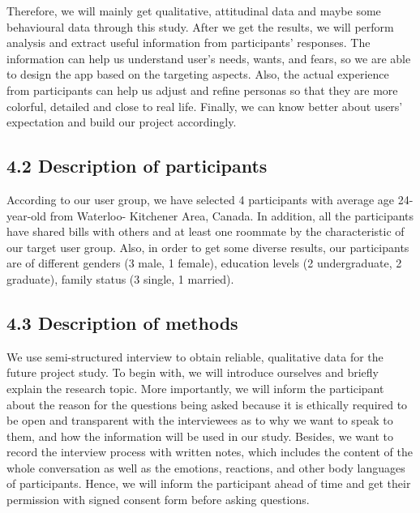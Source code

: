 \documentclass{sigchi}
\begin{document}
Therefore, we will mainly get qualitative, attitudinal data and maybe some behavioural data through this study. After we get the results, we will perform analysis and extract useful information from participants' responses. The information can help us understand user's needs, wants, and fears, so we are able to design the app based on the targeting aspects. Also, the actual experience from participants can help us adjust and refine personas so that they are more colorful, detailed and close to real life. Finally, we can know better about users' expectation and build our project accordingly.



\subsection{4.2 Description of participants}

According to our user group, we have selected 4 participants with average age 24-year-old from Waterloo- Kitchener Area, Canada. In addition, all the participants have shared bills with others and at least one roommate by the characteristic of our target user group. Also, in order to get some diverse results, our participants are of different genders (3 male, 1 female), education levels (2 undergraduate, 2 graduate), family status (3 single, 1 married).

\subsection{4.3 Description of methods}

We use semi-structured interview to obtain reliable, qualitative data for the future project study. To begin with, we will introduce ourselves and briefly explain the research topic. More importantly, we will inform the participant about the reason for the questions being asked because it is ethically required to be open and transparent with the interviewees as to why we want to speak to them, and how the information will be used in our study. Besides, we want to record the interview process with written notes, which includes the content of the whole conversation as well as the emotions, reactions, and other body languages of participants. Hence, we will inform the participant ahead of time and get their permission with signed consent form before asking questions.
\end{document}
